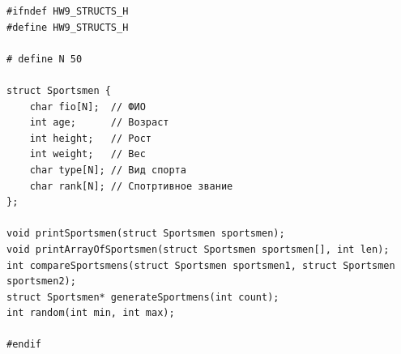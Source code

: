 \documentclass[12pt]{article}
\begin{document}

\begin{lstlisting}[label=structs.h, caption=structs.h]
#ifndef HW9_STRUCTS_H
#define HW9_STRUCTS_H

# define N 50

struct Sportsmen {
    char fio[N];  // ФИО
    int age;      // Возраст
    int height;   // Рост
    int weight;   // Вес
    char type[N]; // Вид спорта
    char rank[N]; // Спотртивное звание
};

void printSportsmen(struct Sportsmen sportsmen);
void printArrayOfSportsmen(struct Sportsmen sportsmen[], int len);
int compareSportsmens(struct Sportsmen sportsmen1, struct Sportsmen sportsmen2);
struct Sportsmen* generateSportmens(int count);
int random(int min, int max);

#endif
\end{lstlisting} 

\newpage
\end{document}
